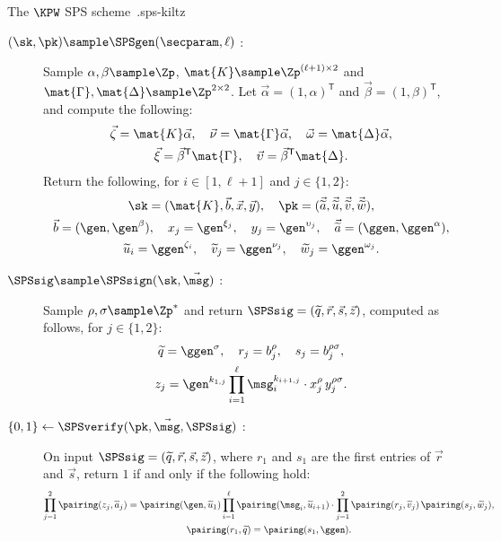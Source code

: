 \begin{primitivebox}{The $\KPW$ SPS scheme~\cite{C:KilPanWee15}.}{sps-kiltz}

  \begin{description}

    \item[$(\sk, \pk) \sample \SPSgen(\secparam, \ell)$ :] Sample $\alpha, \beta
\sample \Zp$, $\mat{K} \sample \Zp^{(\ell+1)\times 2}$ and $\mat{\Gamma},
\mat{\Delta} \sample \Zp^{2\times 2}$. Let $\vec{\alpha} = (1,
\alpha)^{\mathsf{T}}$ and $\vec{\beta} = (1, \beta)^{\mathsf{T}}$, and compute
the following:
      \begin{gather*}
	\vec{\zeta} = \mat{K}\vec{\alpha}, \quad \vec{\nu} =
\mat{\Gamma}\vec{\alpha}, \quad \vec{\omega} = \mat{\Delta}\vec{\alpha}, \\
	\vec{\xi} = \vec{\beta}^{\mathsf{T}}\mat{\Gamma}, \quad \vec{\upsilon} =
\vec{\beta}^{\mathsf{T}}\mat{\Delta}.
      \end{gather*}
      Return the following, for $i \in [1, \ell+1]$ and $j \in \{1, 2\}$:
      \begin{gather*}
	\sk = (\mat{K}, \vec{b}, \vec{x}, \vec{y}), \quad \pk =
(\vec{\widetilde{a}}, \vec{\widetilde{u}}, \vec{\widetilde{v}},
\vec{\widetilde{w}}), \\
	\vec{b} = (\gen, \gen^{\beta}), \quad x_j = \gen^{\xi_j}, \quad y_j =
\gen^{\upsilon_j}, \quad \vec{\widetilde{a}} = (\ggen, \ggen^{\alpha}), \\
	\widetilde{u}_i = \ggen^{\zeta_i}, \quad \widetilde{v}_j =
\ggen^{\nu_j}, \quad \widetilde{w}_j = \ggen^{\omega_j}.
      \end{gather*}

    \item[$\SPSsig \sample \SPSsign(\sk, \vec{\msg})$ :] Sample $\rho, \sigma
\sample \Zp^*$ and return $\SPSsig = (\widetilde{q}, \vec{r}, \vec{s},
\vec{z})$, computed as follows, for $j \in \{1, 2\}$:
      \begin{gather*}
	\widetilde{q} = \ggen^{\sigma}, \quad r_j = b_j^{\rho},
\quad s_j = b_j^{\rho\sigma}, \\
	z_j = \gen^{k_{1,j}}
\prod_{i=1}^{\ell} \msg_i^{k_{i+1,j}} \cdot x_j^{\rho}\, y_j^{\rho\sigma}.
      \end{gather*}

    \item[$\{0,1\} \leftarrow \SPSverify(\pk, \vec{\msg}, \SPSsig)$ :] On input
$\SPSsig = (\widetilde{q}, \vec{r}, \vec{s}, \vec{z})$, where $r_1$ and $s_1$
are the first entries of $\vec{r}$ and $\vec{s}$, return $1$ if and only if the
following hold:
      \begin{gather*}
	\prod_{j=1}^{2} \pairing(z_j, \widetilde{a}_j) = \pairing(\gen,
\widetilde{u}_1) \prod_{i=1}^{\ell} \pairing(\msg_i, \widetilde{u}_{i+1}) \cdot
\prod_{j=1}^{2} \pairing(r_j, \widetilde{v}_j)\, \pairing(s_j,
\widetilde{w}_j), \\
	\pairing(r_1, \widetilde{q}) = \pairing(s_1, \ggen).
      \end{gather*}


\end{description}
\end{primitivebox}
